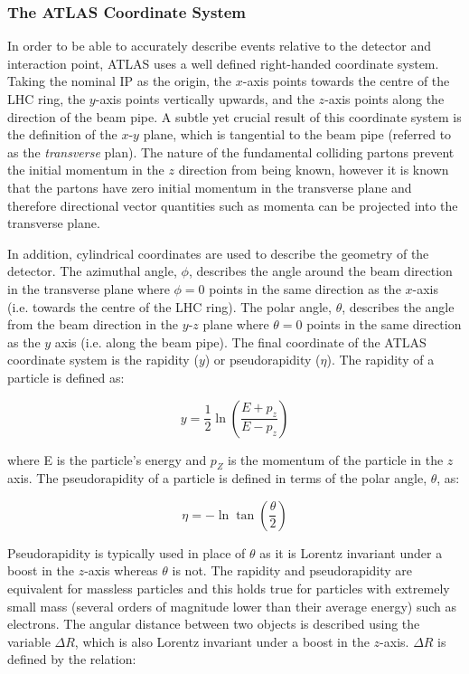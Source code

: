 \documentclass[12pt,a4paper,epsf,portrait,times,epsfig]{article}
\begin{document}
		\subsubsection{The ATLAS Coordinate System}

		In order to be able to accurately describe events relative to the detector and interaction point, ATLAS uses a well defined right-handed coordinate system. Taking the nominal IP as the origin, the $x$-axis points towards the centre of the LHC ring, the $y$-axis points vertically upwards, and the $z$-axis points along the direction of the beam pipe. A subtle yet crucial result of this coordinate system is the definition of the $x$-$y$ plane, which is tangential to the beam pipe (referred to as the \textit{transverse} plan). The nature of the fundamental colliding partons prevent the initial momentum in the $z$ direction from being known, however it is known that the partons have zero initial momentum in the transverse plane and therefore directional vector quantities such as momenta can be projected into the transverse plane. \par

		In addition, cylindrical coordinates are used to describe the geometry of the detector. The azimuthal angle, $\phi$, describes the angle around the beam direction in the transverse plane where $\phi = 0$ points in the same direction as the $x$-axis (i.e. towards the centre of the LHC ring). The polar angle, $\theta$, describes the angle from the beam direction in the $y$-$z$ plane where $\theta = 0$ points in the same direction as the $y$ axis (i.e. along the beam pipe). The final coordinate of the ATLAS coordinate system is the rapidity ($y$) or pseudorapidity ($\eta$). The rapidity of a particle is defined as: 

		\begin{equation}
			y = \frac{1}{2}\ln\left(\frac{E+p_{z}}{E-p_{z}}\right)
		\end{equation}

		where E is the particle's energy and $p_{Z}$ is the momentum of the particle in the $z$ axis. The pseudorapidity of a particle is defined in terms of the polar angle, $\theta$, as:

		\begin{equation}
			\eta = -\ln\tan\left(\frac{\theta}{2}\right)
		\end{equation}

		Pseudorapidity is typically used in place of $\theta$ as it is Lorentz invariant under a boost in the $z$-axis whereas $\theta$ is not. The rapidity and pseudorapidity are equivalent for massless particles and this holds true for particles with extremely small mass (several orders of magnitude lower than their average energy) such as electrons. The angular distance between two objects is described using the variable $\Delta R$, which is also Lorentz invariant under a boost in the $z$-axis. $\Delta R$ is defined by the relation:
\end{document}

